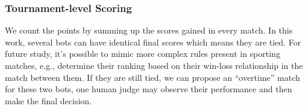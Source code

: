 
\subsubsection{Tournament-level Scoring}
We count the points by summing up the scores gained in every match. 
In this work, several bots can have identical final scores which means they
are tied. For future study, it's possible to mimic more complex
rules present in sporting matches, e.g., determine their ranking based on 
their win-loss relationship in the match between them.  
If they are still tied, we can propose an ``overtime'' match for these 
two bots, one human judge may observe their performance and then 
make the final decision.
